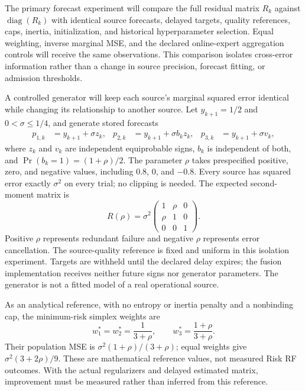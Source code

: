 The primary forecast experiment will compare the full residual matrix $R_k$
against $\operatorname{diag}(R_k)$ with identical source forecasts, delayed
targets, quality references, caps, inertia, initialization, and historical
hyperparameter selection. Equal weighting, inverse marginal MSE, and the
declared online-expert aggregation controls will receive the same observations.
This comparison isolates cross-error information rather than a change in source
precision, forecast fitting, or admission thresholds.

A controlled generator will keep each source's marginal squared error identical
while changing its relationship to another source. Let $y_{k+1}=1/2$ and
$0<\sigma\leq1/4$, and generate stored forecasts
\begin{align}
 p_{1,k}&=y_{k+1}+\sigma z_k,&
 p_{2,k}&=y_{k+1}+\sigma b_kz_k,&
 p_{3,k}&=y_{k+1}+\sigma v_k,
 \label{eq:validation-error-generator}
\end{align}
where $z_k$ and $v_k$ are independent equiprobable signs, $b_k$ is independent
of both, and
$\Pr(b_k=1)=(1+\rho)/2$. The parameter $\rho$ takes prespecified positive,
zero, and negative values, including $0.8$, $0$, and $-0.8$.
Every source has squared error exactly $\sigma^2$ on every trial; no clipping
is needed. The expected second-moment matrix is
\begin{equation}
 R(\rho)=\sigma^2
 \begin{pmatrix}1&\rho&0\\ \rho&1&0\\0&0&1\end{pmatrix}.
 \label{eq:validation-error-matrix}
\end{equation}
Positive $\rho$ represents redundant failure and negative $\rho$ represents
error cancellation. The source-quality reference is fixed and uniform in this
isolation experiment. Targets are withheld until the declared delay expires;
the fusion implementation receives neither future signs nor generator parameters.
The generator is not a fitted model of a real operational source.

As an analytical reference, with no entropy or inertia penalty and a nonbinding
cap, the minimum-risk simplex weights are
\begin{equation}
 w_1^*=w_2^*=\frac{1}{3+\rho},\qquad
 w_3^*=\frac{1+\rho}{3+\rho}.
 \label{eq:validation-oracle-weights}
\end{equation}
Their population MSE is $\sigma^2(1+\rho)/(3+\rho)$; equal weights give
$\sigma^2(3+2\rho)/9$. These are mathematical reference values, not measured
Risk RF outcomes. With the actual regularizers and delayed estimated matrix,
improvement must be measured rather than inferred from this reference.

